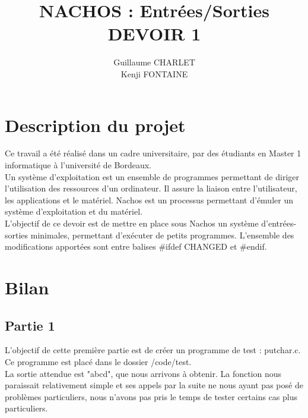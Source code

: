 \documentclass[a4paper]{article}
\title
{
	\LARGE{NACHOS : Entrées/Sorties}
	\HRule \\ [0.5cm]
	\LARGE \textbf{\uppercase{Devoir 1}}
	\HRule \\ [0.5cm]
}
\author{Guillaume CHARLET \\ Kenji FONTAINE}
\begin{document}
\null  %
\nointerlineskip  %
\vfill
\let\snewpage \newpage
\let\newpage \relax
\maketitle
\let \newpage \snewpage
\vfill
\break %


\tableofcontents
\newpage


\section{Description du projet}
Ce travail a été réalisé dans un cadre universitaire,  par des étudiants en
Master 1 informatique à l'université de Bordeaux. \\
Un système d'exploitation est un ensemble de programmes permettant de diriger
l'utilisation des ressources d'un ordinateur. Il assure la liaison entre
l'utilisateur, les applications et le matériel.
Nachos est un processus permettant d'émuler un système d'exploitation et du
matériel. \\
L'objectif de ce devoir est de mettre en place sous Nachos un système
d'entrées-sorties minimales, permettant d'exécuter de petits programmes.
L'ensemble des modifications apportées sont entre balises \#ifdef CHANGED et
\#endif. \\


\section{Bilan}

\subsection{Partie 1}
L'objectif de cette première partie est de créer un programme de test : putchar.c.
Ce programme est placé dans le dossier /code/test. \\
La sortie attendue est "abcd", que nous arrivons à obtenir. La fonction nous
paraissait relativement simple et ses appels par la suite ne nous ayant pas posé
de problèmes particuliers, nous n'avons pas pris le temps de tester certains cas
plus particuliers.
\end{document}
